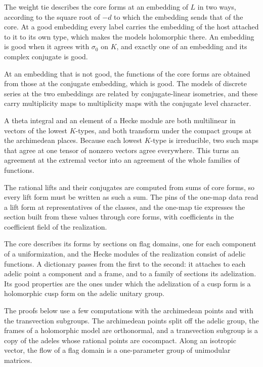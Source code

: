 The weight tie describes the core forms at an embedding of $L$ in two ways, according to the square
root of $-d$ to which the embedding sends that of the core. At a good embedding every label carries
the embedding of the host attached to it to its own type, which makes the models holomorphic there.
An embedding is good when it agrees with $\sigma_0$ on $K$, and exactly one of an embedding and its
complex conjugate is good.

At an embedding that is not good, the functions of the core forms are obtained from those at the
conjugate embedding, which is good. The models of
discrete series at the two embeddings are related by conjugate-linear isometries, and these carry
multiplicity maps to multiplicity maps with the conjugate level character.

A theta integral and an element of a Hecke module are both multilinear in vectors of the lowest
$K$-types, and both transform under the compact groups at the archimedean places. Because each lowest
$K$-type is irreducible, two such maps that agree at one tensor of nonzero vectors agree everywhere.
This turns an agreement at the extremal vector into an agreement of the whole families of functions.

The rational lifts and their conjugates are computed from sums of core forms, so every lift form must
be written as such a sum. The pins of the one-map data read a lift form at representatives of the
classes, and the one-map tie expresses the section built from these values through core forms, with
coefficients in the coefficient field of the realization.

The core describes its forms by sections on flag domains, one for each component of a uniformization,
and the Hecke modules of the realization consist of adelic functions. A dictionary passes from the
first to the second: it attaches to each adelic point a component and a frame, and to a family of
sections its adelization. Its good properties are the ones under which the adelization of a cusp form
is a holomorphic cusp form on the adelic unitary group.

The proofs below use a few computations with the archimedean points and with the transvection
subgroups. The archimedean points split off the adelic group, the frames of a holomorphic model are
orthonormal, and a transvection subgroup is a copy of the adeles whose rational points are cocompact.
Along an isotropic vector, the flow of a flag domain is a one-parameter group of unimodular matrices.

